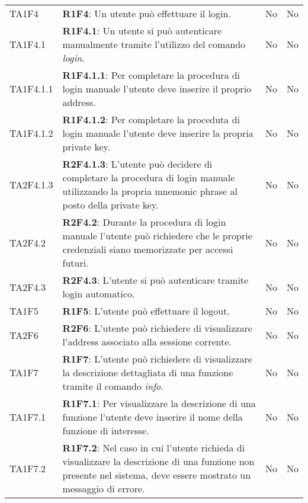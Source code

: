 \begin{longtable}{ 
		>{\centering}p{} 
		>{}p{} 
		>{\centering}p{}
		>{\centering}p{} }
	TA1F4 & \textbf{R1F4}: Un utente può effettuare il login. 						& No & No \tabularnewline
	TA1F4.1 & \textbf{R1F4.1}: Un utente si può autenticare manualmente tramite l'utilizzo 
			del comando \textit{login}. 											& No & No \tabularnewline
	TA1F4.1.1 & \textbf{R1F4.1.1}: Per completare la procedura di login manuale l'utente deve inserire
			 il proprio address.													& No & No \tabularnewline
	TA1F4.1.2 & \textbf{R1F4.1.2}: Per completare la proceduta di login manuale l'utente deve inserire
			 la propria private key\ped{\textit{G}}. 								& No & No \tabularnewline
	TA2F4.1.3 & \textbf{R2F4.1.3}: L'utente può decidere di completare la procedura di login manuale 
			 utilizzando la propria mnemonic phrase al posto della private key\ped{\textit{G}}.		& No & No \tabularnewline
	TA2F4.2 & \textbf{R2F4.2}: Durante la procedura di login manuale l'utente può richiedere che
			 le proprie credenziali siano memorizzate per accessi futuri. 			& No & No \tabularnewline
	TA2F4.3 & \textbf{R2F4.3}: L'utente si può autenticare tramite login automatico.& No & No \tabularnewline
	
	TA1F5 & \textbf{R1F5}: L'utente può effettuare il logout. 						& No & No \tabularnewline
	
	TA2F6 & \textbf{R2F6}: L'utente può richiedere di visualizzare l'address 
			associato alla sessione corrente. 										& No & No \tabularnewline
	
	TA1F7 & \textbf{R1F7}: L'utente può richiedere di visualizzare la descrizione dettagliata di una funzione
		tramite il comando \textit{info}.											& No & No \tabularnewline
	TA1F7.1 & \textbf{R1F7.1}: Per visualizzare la descrizione di una funzione l'utente deve inserire 
		il nome della funzione di interesse.										& No & No \tabularnewline
	TA1F7.2 & \textbf{R1F7.2}: Nel caso in cui l'utente richieda di visualizzare la descrizione di una 
		funzione non presente nel sistema, deve essere mostrato un messaggio di
		errore.															 			& No & No \tabularnewline
	

\end{longtable}
